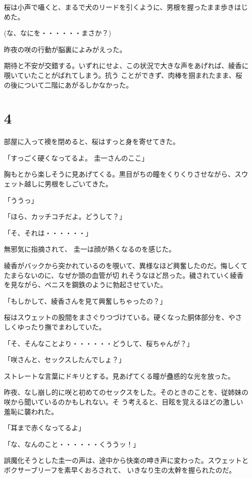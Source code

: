 ﻿\documentclass[book,tate]{jlreq}
\begin{document}
桜は小声で囁くと、まるで犬のリードを引くように、男根を握ったまま歩きはじめた。

(な、なにを・・・・・・まさか？)

昨夜の咲の行動が脳裏によみがえった。

期待と不安が交錯する。いずれにせよ、この状況で大きな声をあげれば、綾香に覗いていたことがばれてしまう。抗う ことができず、肉棒を掴まれたまま、桜の後について二階にあがるしかなかった。

\section*{4}

部屋に入って襖を閉めると、桜はすっと身を寄せてきた。

「すっごく硬くなってるよ。 圭一さんのここ」

胸もとから楽しそうに見あげてくる。黒目がちの瞳をくりくりさせながら、スウェット越しに男根をしごいてきた。

「ううっ」

「ほら、カッチコチだよ。どうして？」

「そ、それは・・・・・・」

無邪気に指摘されて、 圭一は顔が熱くなるのを感じた。

綾香がバックから突かれているのを覗いて、異様なほど興奮したのだ。悔しくてたまらないのに、なぜか頭の血管が切 れそうなほど昂った。穢されていく綾香を見ながら、ペニスを鋼鉄のように勃起させていた。

「もしかして、綾香さんを見て興奮しちゃったの？」

桜はスウェットの股間をまさぐりつづけている。硬くなった胴体部分を、やさしくゆったり撫でまわしていた。

「そ、そんなことより・・・・・・どうして、桜ちゃんが？」

「咲さんと、セックスしたんでしょ？」

ストレートな言葉にドキリとする。見あげてくる瞳が蠱惑的な光を放った。

昨夜、なし崩し的に咲と初めてのセックスをした。そのときのことを、従姉妹の咲から聞いているのかもしれない。そ う考えると、目眩を覚えるほどの激しい羞恥に襲われた。

「耳まで赤くなってるよ」

「な、なんのこと・・・・・・くううッ！」

誤魔化そうとした圭一の声は、途中から快楽の呻き声に変わった。スウェットとボクサーブリーフを素早くおろされて、 いきなり生の太幹を握られたのだ。
\end{document}
